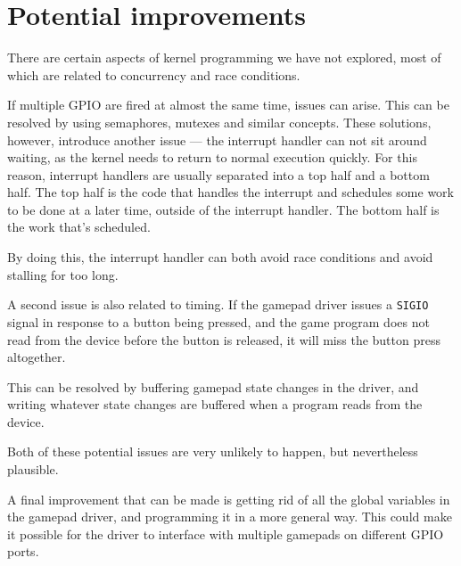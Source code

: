 \chapter{Potential improvements}
There are certain aspects of kernel programming we have not explored, most of which are related to concurrency and race conditions.

If multiple GPIO are fired at almost the same time, issues can arise. This can be resolved by using semaphores, mutexes and similar concepts. These solutions, however, introduce another issue --- the interrupt handler can not sit around waiting, as the kernel needs to return to normal execution quickly. 
For this reason, interrupt handlers are usually separated into a top half and a bottom half. The top half is the code that handles the interrupt and schedules some work to be done at a later time, outside of the interrupt handler. The bottom half is the work that's scheduled.

By doing this, the interrupt handler can both avoid race conditions and avoid stalling for too long.

A second issue is also related to timing. If the gamepad driver issues a \texttt{SIGIO} signal in response to a button being pressed, and the game program does not read from the device before the button is released, it will miss the button press altogether.

This can be resolved by buffering gamepad state changes in the driver, and writing whatever state changes are buffered when a program reads from the device.

Both of these potential issues are very unlikely to happen, but nevertheless plausible.

A final improvement that can be made is getting rid of all the global variables in the gamepad driver, and programming it in a more general way. This could make it possible for the driver to interface with multiple gamepads on different GPIO ports.